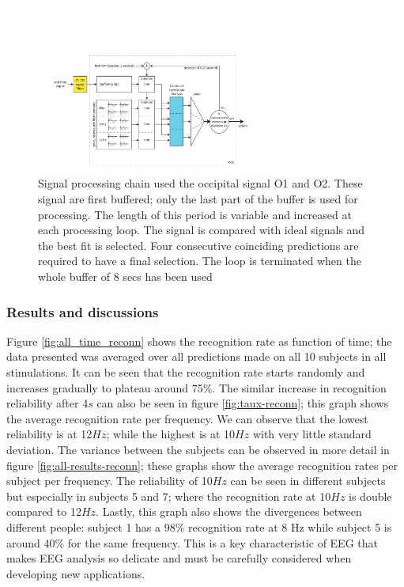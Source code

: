 \documentclass{svmult}
\begin{document}
\begin{figure}
\center
\includegraphics[width=0.7\textwidth]{figures/schema-openvibe-cca.pdf}
\caption{Signal processing chain used the occipital signal O1 and O2. These signal are first buffered; only the last part of the buffer is used for processing. The length of this period is variable and increased at each processing loop. The signal is compared with ideal signals and the best fit is selected. Four consecutive coinciding predictions are required to have a final selection. The loop is terminated when the whole buffer of 8 secs has been used}
\label{fig:schema-openvibe-cca}
\end{figure}

\subsubsection{Results and discussions}
Figure \ref{fig:all_time_reconn} shows the recognition rate as function of time; the data presented was averaged over all predictions made on all 10 subjects in all stimulations. It can be seen that the recognition rate starts randomly and increases gradually to plateau around 75\%. The similar increase in recognition reliability after 4$s$ can also be seen in figure \ref{fig:taux-reconn}; this graph shows the average recognition rate per frequency. We can observe that the lowest reliability is at 12$Hz$; while the highest is at 10$Hz$ with very little standard deviation. The variance between the subjects can be observed in more detail in figure \ref{fig:all-results-reconn}; these graphs show the average recognition rates per subject per frequency. The reliability of 10$Hz$ can be seen in different subjects but especially in subjects 5 and 7; where the recognition rate at 10$Hz$ is double compared to 12$Hz$. Lastly, this graph also shows the divergences between different people: subject 1 has a 98\% recognition rate at 8 Hz while subject 5 is around 40\% for the same frequency. This is a key characteristic of EEG that makes EEG analysis so delicate and must be carefully considered when developing new applications.
\end{document}

